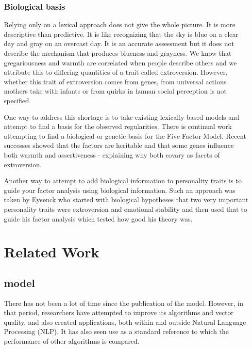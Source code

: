 \subsection{Biological basis}

Relying only on a lexical approach does not give the whole picture. It is more
descriptive than predictive. It is like recognizing that the sky is blue on a
clear day and gray on an overcast day. It is an accurate assessment but it does
not describe the mechanism that produces blueness and grayness. 
We know that gregariousness and warmth are 
correlated when people describe others and we attribute this to differing
quantities of a trait called extroversion. However, whether this trait of
extroversion comes from genes, from universal actions mothers take with 
infants or from quirks in human social perception is not specified.

One way to address this shortage is to take existing lexically-based models and
attempt to find a basis for the observed regularities. There is continual work
attempting to find a biological or genetic basis for the Five Factor Model.
Recent successes showed that the factors are heritable  and that some genes influence both warmth and 
assertiveness - explaining why both covary as facets of 
extroversion. 

Another way to attempt to add biological information to personality traits is
to guide your factor analysis using biological information. Such an approach
was taken by Eysenck who started with biological hypotheses that two very 
important personality traits were extroversion and emotional stability and
then used that to guide his factor analysis which tested how good his theory
was.

\chapter{Related Work}

\section{\modelname{} model}

There has not been a lot of time since the publication of the \modelname{} model. 
However, in that period, researchers have attempted to improve its algorithms
and vector quality, and also created applications, both within and outside 
Natural Language Processing (NLP). It has also seen use as a 
standard reference to which the performance of other algorithms is compared.

